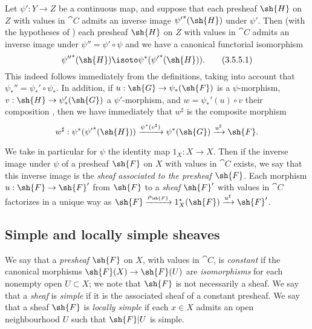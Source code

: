 \begin{env}[3.5.5]
\label{0.3.5.5}
Let $\psi':Y\to Z$ be a continuous map, and suppose that each presheaf $\sh{H}$
on $Z$ with values in $\cat{C}$ admits an inverse image ${\psi'}^*(\sh{H})$ under
$\psi'$. Then (with the hypotheses of ) each presheaf $\sh{H}$
on $Z$ with values in $\cat{C}$ admits an inverse image under $\psi''=\psi'\circ\psi$
and we have a canonical functorial isomorphism
\[
  {\psi''}^*(\sh{H})\isoto\psi^*({\psi'}^*(\sh{H})).
  \tag{3.5.5.1}
\]
This indeed follows immediately from the definitions, taking into account that
$\psi_*''=\psi_*'\circ\psi_*$. In addition, if $u:\sh{G}\to\psi_*(\sh{F})$ is a
$\psi$-morphism, $v:\sh{H}\to\psi_*'(\sh{G})$ a $\psi'$-morphism, and
$w=\psi_*'(u)\circ v$ their composition , then we have
immediately that $w^\sharp$ is the composite morphism
\[
  w^\sharp:\psi^*({\psi'}^*(\sh{H}))\xrightarrow{\psi^*(v^\sharp)}\psi^*(\sh{G})\xrightarrow{u^\sharp}\sh{F}.
\]
\end{env}

\begin{env}[3.5.6]
\label{0.3.5.6}
We take in particular for $\psi$ the identity map $1_X:X\to X$. Then if the
inverse image under $\psi$ of a presheaf $\sh{F}$ on $X$ with values in $\cat{C}$
exists, we say that this inverse image is the \emph{sheaf associated to the
presheaf $\sh{F}$}. Each morphism $u:\sh{F}\to\sh{F}'$ from $\sh{F}$ to a
\emph{sheaf} $\sh{F}'$ with values in $\cat{C}$ factorizes in a unique way as
$\sh{F}\xrightarrow{\rho_\sh{F}}1_X^*(\sh{F})\xrightarrow{u^\sharp}\sh{F}'$.
\end{env}

\subsection{Simple and locally simple sheaves}
\label{subsection:0.3.6}

\begin{env}[3.6.1]
\label{0.3.6.1}
We say that a \emph{presheaf} $\sh{F}$ on $X$, with values in $\cat{C}$, is
\emph{constant} if the canonical morphisms $\sh{F}(X)\to\sh{F}(U)$ are
\emph{isomorphisms} for each nonempty open $U\subset X$; we note that $\sh{F}$
is not necessarily a sheaf. We say that a \emph{sheaf} is \emph{simple} if it is
the associated sheaf  of a constant presheaf. We say that a
sheaf $\sh{F}$ is \emph{locally simple} if each $x\in X$ admits an open
neighbourhood $U$ such that $\sh{F}|U$ is simple.
\end{env}

